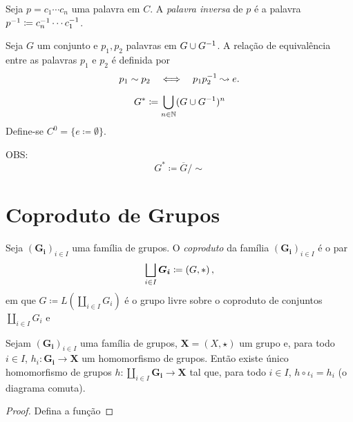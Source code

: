 Seja $p=c_1 \cdots c_n$ uma palavra em $C$. A \emph{palavra inversa} de $p$ é a palavra $p^{-1} \coloneqq c_n^{-1} \cdots c_1^{-1}$.

\begin{defi}
Seja $G$ um conjunto e $p_1,p_2 $ palavras em $G \cup G^{-1}$. A relação de equivalência entre as palavras $p_1$ e $p_2$ é definida por
	\begin{equation*}
	p_1 \sim p_2 \quad \Longleftrightarrow \quad p_1p_2^{-1} \leadsto e.
	\end{equation*}	
\end{defi}


	\begin{equation*}
	G^* \coloneqq \bigcup_{n \in \mathbb{N}} (G \cup G^{-1})^n
	\end{equation*}
 Define-se $C^0 = \{e\coloneqq \emptyset\}$.

OBS: 
	\begin{equation*}
	G^* \coloneqq \overline{G}/\sim
	\end{equation*}

\section{Coproduto de Grupos}

\begin{defi}
Seja $(\bm{G_i})_{i \in I}$ uma família de grupos. O \emph{coproduto} da família $(\bm{G_i})_{i \in I}$ é o par
	\begin{equation*}
	\bigsqcup_{i \in I} \bm{G_i} \coloneqq \left(G,\ast \right),
	\end{equation*}
em que $G \coloneqq L(\coprod_{i \in I} G_i)$ é o grupo livre sobre o coproduto de conjuntos $\coprod_{i \in I} G_i$ e 
\end{defi}

\begin{prop}
Sejam $(\bm{G_i})_{i \in I}$ uma família de grupos, $\bm X = (X,\star)$ um grupo e, para todo $i \in I$, $h_i: \bm{G_i} \to \bm X$ um homomorfismo de grupos. Então existe único homomorfismo de grupos $h: \coprod_{i \in I} \bm{G_i} \to \bm X$ tal que, para todo $i \in I$, $h \circ \iota_i = h_i$ (o diagrama comuta).
\begin{figure}[!h]
\centering
{}
\end{figure}
\end{prop}
\begin{proof}
Defina a função 
\end{proof}





